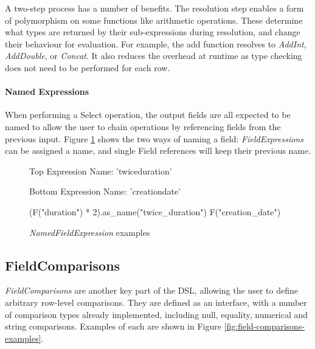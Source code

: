 A two-step process has a number of benefits. The resolution step enables a form of polymorphism on some functions like arithmetic operations. These determine what types are returned by their sub-expressions during resolution, and change their behaviour for evaluation. For example, the add function resolves to \textit{AddInt}, \textit{AddDouble}, or \textit{Concat}. It also reduces the overhead at runtime as type checking does not need to be performed for each row.

\paragraph{Named Expressions}
When performing a Select operation, the output fields are all expected to be named to allow the user to chain operations by referencing fields from the previous input. Figure \ref{fig:namedfieldexpression-examples} shows the two ways of naming a field: \textit{FieldExpressions} can be assigned a name, and single Field references will keep their previous name.

\begin{figure}[htp]
	Top Expression Name: 'twice\textunderscore duration'
	
	Bottom Expression Name: 'creation\textunderscore date'
	\begin{python}
(F("duration") * 2).as_name("twice_duration")
F("creation_date")
	\end{python}
	\caption{\textit{NamedFieldExpression} examples}
	\label{fig:namedfieldexpression-examples}
\end{figure}

\subsection{FieldComparisons}\label{subsec:fieldcomparisons}
\textit{FieldComparisons} are another key part of the DSL, allowing the user to define arbitrary row-level comparisons. They are defined as an interface, with a number of comparison types already implemented, including null, equality, numerical and string comparisons. Examples of each are shown in Figure \ref{fig:field-comparisons-examples}.

